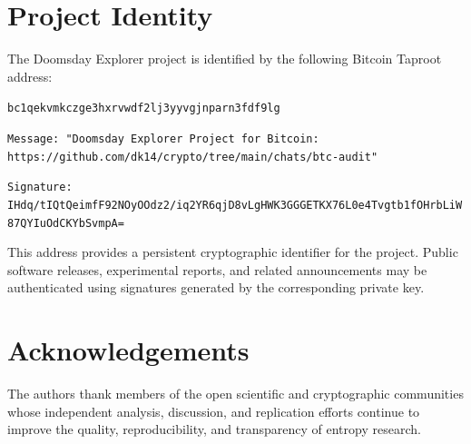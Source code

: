 \documentclass[11pt]{article}
\begin{document}

\section*{Project Identity}

The Doomsday Explorer project\cite{doomsdayThermal2026} is identified by the following
Bitcoin Taproot address:

\begin{center}
\texttt{bc1qekvmkczge3hxrvwdf2lj3yyvgjnparn3fdf9lg}

\texttt{Message: "Doomsday Explorer Project for Bitcoin: https://github.com/dk14/crypto/tree/main/chats/btc-audit"}

\texttt{Signature: IHdq/tIQtQeimfF92NOyOOdz2/iq2YR6qjD8vLgHWK3GGGETKX76L0e4Tvgtb1fOHrbLiW87QYIuOdCKYbSvmpA=}
\end{center}

This address provides a persistent cryptographic identifier for
the project. Public software releases, experimental reports,
and related announcements may be authenticated using signatures
generated by the corresponding private key.

\section*{Acknowledgements}

The authors thank
members of the open scientific and cryptographic communities
whose independent analysis,
discussion,
and replication efforts
continue to improve
the quality,
reproducibility,
and transparency
of entropy research.




\end{document}
